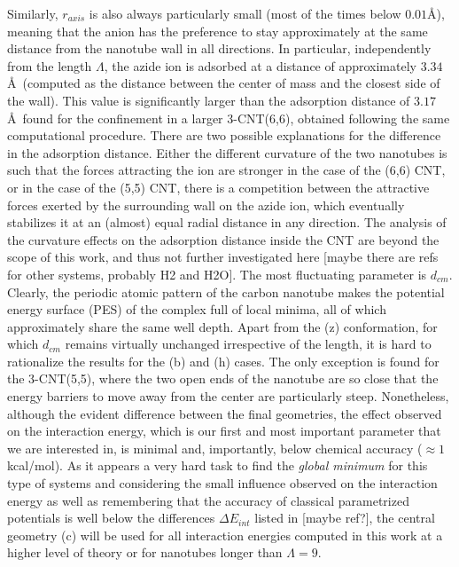 \documentclass[utf8]{article}
\begin{document}
Similarly, $r_{axis}$ is also always particularly small (most of the times below $0.01$\AA), meaning that the anion has the preference to stay approximately at the same distance from the nanotube wall in all directions.
In particular, independently from the length $\Lambda$, the azide ion is adsorbed at a distance of approximately $3.34$\AA\ (computed as the distance between the \ntm center of mass and the closest side of the wall). This value is significantly larger than the adsorption distance of $3.17$\AA\ found for the confinement in a larger 3-CNT(6,6), obtained following the same computational procedure.
There are two possible explanations for the difference in the adsorption distance. Either the different curvature of the two nanotubes is such that the forces attracting the ion are stronger in the case of the (6,6) CNT, or in the case of the (5,5) CNT, there is a competition between the attractive forces exerted by the surrounding wall on the azide ion, which eventually stabilizes it at an (almost) equal radial distance in any direction.
The analysis of the curvature effects on the adsorption distance inside the CNT are beyond the scope of this work, and thus not further investigated here [maybe there are refs for other systems, probably H2 and H2O].
The most fluctuating parameter is $d_{cm}$. Clearly, the periodic atomic pattern of the carbon nanotube makes the potential energy surface (PES) of the complex full of local minima, all of which approximately share the same well depth. Apart from the (z) conformation, for which $d_{cm}$ remains virtually unchanged irrespective of the length, it is hard to rationalize the results for the (b) and (h) cases.
The only exception is found for the 3-CNT(5,5), where the two open ends of the nanotube are so close that the energy barriers to move away from the center are particularly steep.
Nonetheless, although the evident difference between the final geometries, the effect observed on the interaction energy, which is our first and most important parameter that we are interested in, is minimal and, importantly, below chemical accuracy ($\approx 1$ kcal/mol).
As it appears a very hard task to find the \textit{global minimum} for this type of systems and considering the small influence observed on the interaction energy as well as remembering that the accuracy of classical parametrized potentials is well below the differences $\Delta E_{int}$ listed in  [maybe ref?], the central geometry (c) will be used for all interaction energies computed in this work at a higher level of theory or for nanotubes longer than $\Lambda = 9$.
\end{document}

